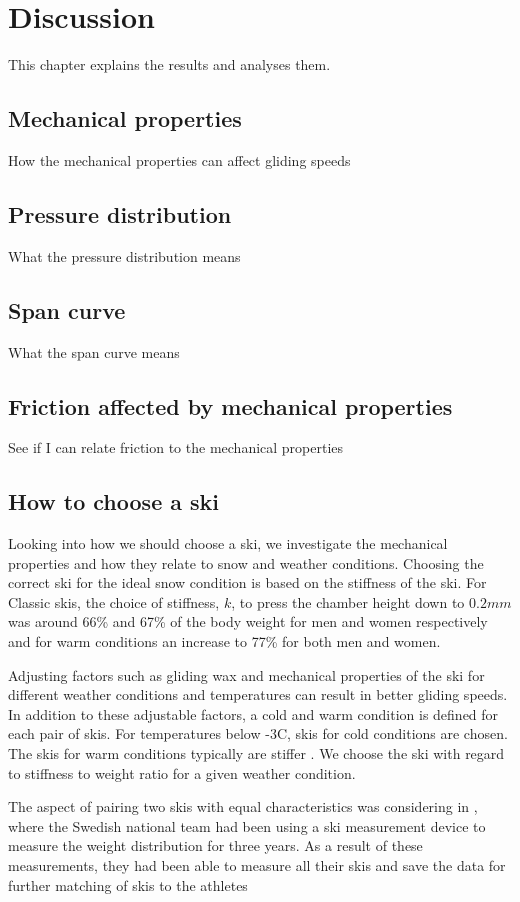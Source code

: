 \chapter{Discussion}
This chapter explains the results and analyses them.


\section{Mechanical properties}
How the mechanical properties can affect gliding speeds

\section{Pressure distribution}
What the pressure distribution means

\section{Span curve}
What the span curve means

\section{Friction affected by mechanical properties}
See if I can relate friction to the mechanical properties

\section{How to choose a ski}
\label{sec:choosingaski}
Looking into how we should choose a ski, we investigate the mechanical properties and how they relate to snow and weather conditions.
Choosing the correct ski for the ideal snow condition is based on the stiffness of the ski. For Classic skis, the choice of stiffness, $k$, to press the chamber height down to $0.2mm$ was around 66\% and 67\% of the body weight for men and women respectively and for warm conditions an increase to 77\% for both men and women.

Adjusting factors such as gliding wax and mechanical properties of the ski for different weather conditions and temperatures can result in better gliding speeds. In addition to these adjustable factors, a cold and warm condition is defined for each pair of skis. For temperatures below -3\textdegree C, skis for cold conditions are chosen. The skis for warm conditions typically are stiffer \citep{breitschadel_variation_2012}. We choose the ski with regard to stiffness to weight ratio for a given weather condition.

The aspect of pairing two skis with equal characteristics was considering in \citep{backstrom_essential_2008}, where the Swedish national team had been using a ski measurement device to measure the weight distribution for three years. As a result of these measurements, they had been able to measure all their skis and save the data for further matching of skis to the athletes